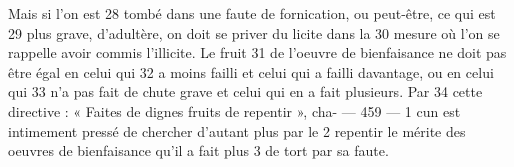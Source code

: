 Mais si l'on est	 
28	 	tombé dans une faute de fornication, ou peut-être, ce qui est	 
29	 	plus grave, d'adultère, on doit se priver du licite dans la	 
30	 	mesure où l'on se rappelle avoir commis l'illicite. Le fruit	 
31	 	de l'oeuvre de bienfaisance ne doit pas être égal en celui qui	 
32	 	a moins failli et celui qui a failli davantage, ou en celui qui	 
33	 	n'a pas fait de chute grave et celui qui en a fait plusieurs. Par	 
34	 	cette directive : « Faites de dignes fruits de repentir », cha-	 
 	--- 459 ---	 
1	 	cun est intimement pressé de chercher d'autant plus par le	 
2	 	repentir le mérite des oeuvres de bienfaisance qu'il a fait plus	 
3	 	de tort par sa faute.